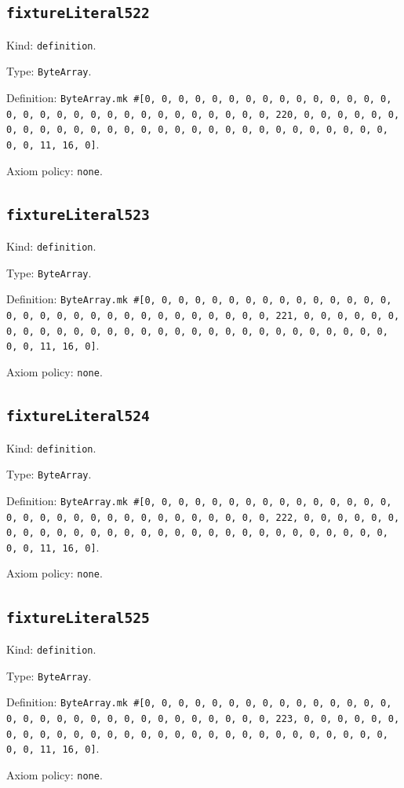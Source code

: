 \documentclass[11pt]{article}
\begin{document}
\subsection*{\texttt{fixtureLiteral522}}
\noindent Kind: \texttt{definition}.\par
\noindent Type: \texttt{ByteArray}.\par
\noindent Definition: \texttt{ByteArray.mk \#[0, 0, 0, 0, 0, 0, 0, 0, 0, 0, 0, 0, 0, 0, 0, 0, 0, 0, 0, 0, 0, 0, 0, 0, 0, 0, 0, 0, 0, 0, 0, 220, 0, 0, 0, 0, 0, 0, 0, 0, 0, 0, 0, 0, 0, 0, 0, 0, 0, 0, 0, 0, 0, 0, 0, 0, 0, 0, 0, 0, 0, 0, 0, 11, 16, 0]}.\par
\noindent Axiom policy: \texttt{none}.\par
\subsection*{\texttt{fixtureLiteral523}}
\noindent Kind: \texttt{definition}.\par
\noindent Type: \texttt{ByteArray}.\par
\noindent Definition: \texttt{ByteArray.mk \#[0, 0, 0, 0, 0, 0, 0, 0, 0, 0, 0, 0, 0, 0, 0, 0, 0, 0, 0, 0, 0, 0, 0, 0, 0, 0, 0, 0, 0, 0, 0, 221, 0, 0, 0, 0, 0, 0, 0, 0, 0, 0, 0, 0, 0, 0, 0, 0, 0, 0, 0, 0, 0, 0, 0, 0, 0, 0, 0, 0, 0, 0, 0, 11, 16, 0]}.\par
\noindent Axiom policy: \texttt{none}.\par
\subsection*{\texttt{fixtureLiteral524}}
\noindent Kind: \texttt{definition}.\par
\noindent Type: \texttt{ByteArray}.\par
\noindent Definition: \texttt{ByteArray.mk \#[0, 0, 0, 0, 0, 0, 0, 0, 0, 0, 0, 0, 0, 0, 0, 0, 0, 0, 0, 0, 0, 0, 0, 0, 0, 0, 0, 0, 0, 0, 0, 222, 0, 0, 0, 0, 0, 0, 0, 0, 0, 0, 0, 0, 0, 0, 0, 0, 0, 0, 0, 0, 0, 0, 0, 0, 0, 0, 0, 0, 0, 0, 0, 11, 16, 0]}.\par
\noindent Axiom policy: \texttt{none}.\par
\subsection*{\texttt{fixtureLiteral525}}
\noindent Kind: \texttt{definition}.\par
\noindent Type: \texttt{ByteArray}.\par
\noindent Definition: \texttt{ByteArray.mk \#[0, 0, 0, 0, 0, 0, 0, 0, 0, 0, 0, 0, 0, 0, 0, 0, 0, 0, 0, 0, 0, 0, 0, 0, 0, 0, 0, 0, 0, 0, 0, 223, 0, 0, 0, 0, 0, 0, 0, 0, 0, 0, 0, 0, 0, 0, 0, 0, 0, 0, 0, 0, 0, 0, 0, 0, 0, 0, 0, 0, 0, 0, 0, 11, 16, 0]}.\par
\noindent Axiom policy: \texttt{none}.\par
\end{document}
